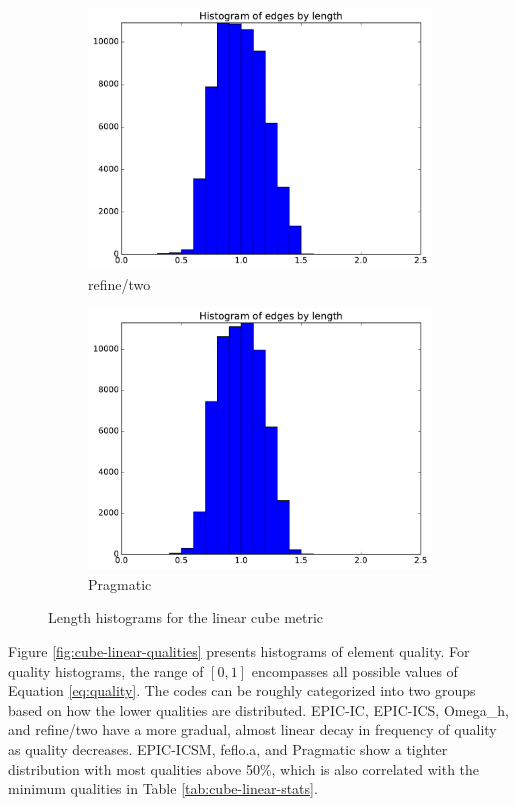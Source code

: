 \documentclass[3p,times,procedia,number]{elsarticle}
\begin{document}
\begin{figure}
\begin{subfigure}{.4\textwidth}
\includegraphics[width=\textwidth]{refine-two-cube-linear-length.pdf}
\caption{refine/two}
\end{subfigure}
\begin{subfigure}{.4\textwidth}
\centering
\includegraphics[width=\textwidth]{pragmatic-cube-linear-length.pdf}
\caption{Pragmatic}
\end{subfigure}
\caption{Length histograms for the linear cube metric}
\label{fig:cube-linear-lengths}
\end{figure}

Figure \ref{fig:cube-linear-qualities} presents histograms of element
quality.
For quality histograms, the range of $[0,1]$ encompasses all possible
values of Equation \ref{eq:quality}.
The codes can be roughly categorized into two groups based on
how the lower qualities are distributed.
EPIC-IC, EPIC-ICS, Omega\_h, and refine/two have a more gradual,
almost linear decay in frequency of quality as quality decreases.
EPIC-ICSM, feflo.a, and Pragmatic show a tighter distribution
with most qualities above 50\%, which is also correlated
with the minimum qualities in Table \ref{tab:cube-linear-stats}.
\end{document}
